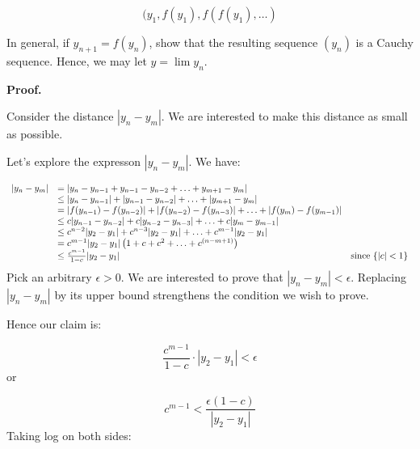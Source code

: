 \documentclass[10pt]{article}
\begin{document}
\begin{equation*}
( y_{1} ,f( y_{1}) ,f( f( y_{1}) ,\dotsc )
\end{equation*}


In general, if $\displaystyle y_{n+1} =f( y_{n})$, show that the resulting sequence $\displaystyle ( y_{n})$ is a Cauchy sequence. Hence, we may let $\displaystyle y=\lim y_{n}$.



\textbf{Proof.}



Consider the distance $\displaystyle |y_{n} -y_{m} |$. We are interested to make this distance as small as possible.



Let's explore the expresson $\displaystyle |y_{n} -y_{m} |$. We have:


\begin{equation*}
\begin{array}{ c l c }
|y_{n} -y_{m} | & =|y_{n} -y_{n-1} +y_{n-1} -y_{n-2} +\dotsc +y_{m+1} -y_{m} | & \\
 & \leq |y_{n} -y_{n-1} |+|y_{n-1} -y_{n-2} |+\dotsc +|y_{m+1} -y_{m} | & \\
 & =|f( y_{n-1}) -f( y_{n-2}) |+|f( y_{n-2}) -f( y_{n-3}) |+\dotsc +|f( y_{m}) -f( y_{m-1}) | & \\
 & \leq c|y_{n-1} -y_{n-2} |+c|y_{n-2} -y_{n-3} |+\dotsc +c|y_{m} -y_{m-1} | & \\
 & \leq c^{n-2} |y_{2} -y_{1} |+c^{n-3} |y_{2} -y_{1} |+\dotsc +c^{m-1} |y_{2} -y_{1} | & \\
 & =c^{m-1} |y_{2} -y_{1} |\left( 1+c+c^{2} +\dotsc +c^{( n-m+1)}\right) & \\
 & \leq \frac{c^{m-1}}{1-c} |y_{2} -y_{1} | & \text{since }\{|c|< 1\}
\end{array}
\end{equation*}
Pick an arbitrary $\displaystyle \epsilon  >0$. We are interested to prove that $\displaystyle |y_{n} -y_{m} |< \epsilon $. Replacing $\displaystyle |y_{n} -y_{m} |$ by its upper bound strengthens the condition we wish to prove. 



Hence our claim is:


\begin{equation*}
\frac{c^{m-1}}{1-c} \cdot |y_{2} -y_{1} |< \epsilon 
\end{equation*}
or


\begin{equation*}
c^{m-1} < \frac{\epsilon ( 1-c)}{|y_{2} -y_{1} |}
\end{equation*}
Taking log on both sides:
\end{document}
